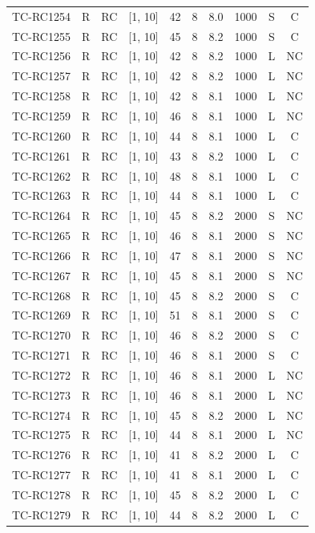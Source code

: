 \begin{longtable}{lccccccccc}
TC-RC1254 & R & RC & [1, 10] & 42 & 8 & 8.0 & 1000 & S & C \\
TC-RC1255 & R & RC & [1, 10] & 45 & 8 & 8.2 & 1000 & S & C \\
TC-RC1256 & R & RC & [1, 10] & 42 & 8 & 8.2 & 1000 & L & NC \\
TC-RC1257 & R & RC & [1, 10] & 42 & 8 & 8.2 & 1000 & L & NC \\
TC-RC1258 & R & RC & [1, 10] & 42 & 8 & 8.1 & 1000 & L & NC \\
TC-RC1259 & R & RC & [1, 10] & 46 & 8 & 8.1 & 1000 & L & NC \\
TC-RC1260 & R & RC & [1, 10] & 44 & 8 & 8.1 & 1000 & L & C \\
TC-RC1261 & R & RC & [1, 10] & 43 & 8 & 8.2 & 1000 & L & C \\
TC-RC1262 & R & RC & [1, 10] & 48 & 8 & 8.1 & 1000 & L & C \\
TC-RC1263 & R & RC & [1, 10] & 44 & 8 & 8.1 & 1000 & L & C \\
TC-RC1264 & R & RC & [1, 10] & 45 & 8 & 8.2 & 2000 & S & NC \\
TC-RC1265 & R & RC & [1, 10] & 46 & 8 & 8.1 & 2000 & S & NC \\
TC-RC1266 & R & RC & [1, 10] & 47 & 8 & 8.1 & 2000 & S & NC \\
TC-RC1267 & R & RC & [1, 10] & 45 & 8 & 8.1 & 2000 & S & NC \\
TC-RC1268 & R & RC & [1, 10] & 45 & 8 & 8.2 & 2000 & S & C \\
TC-RC1269 & R & RC & [1, 10] & 51 & 8 & 8.1 & 2000 & S & C \\
TC-RC1270 & R & RC & [1, 10] & 46 & 8 & 8.2 & 2000 & S & C \\
TC-RC1271 & R & RC & [1, 10] & 46 & 8 & 8.1 & 2000 & S & C \\
TC-RC1272 & R & RC & [1, 10] & 46 & 8 & 8.1 & 2000 & L & NC \\
TC-RC1273 & R & RC & [1, 10] & 46 & 8 & 8.1 & 2000 & L & NC \\
TC-RC1274 & R & RC & [1, 10] & 45 & 8 & 8.2 & 2000 & L & NC \\
TC-RC1275 & R & RC & [1, 10] & 44 & 8 & 8.1 & 2000 & L & NC \\
TC-RC1276 & R & RC & [1, 10] & 41 & 8 & 8.2 & 2000 & L & C \\
TC-RC1277 & R & RC & [1, 10] & 41 & 8 & 8.1 & 2000 & L & C \\
TC-RC1278 & R & RC & [1, 10] & 45 & 8 & 8.2 & 2000 & L & C \\
TC-RC1279 & R & RC & [1, 10] & 44 & 8 & 8.2 & 2000 & L & C \\

\end{longtable}
